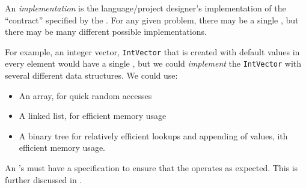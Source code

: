 \begin{definition}[Implementation]\label{def:ADT_Implementation}
  An \emph{implementation} is the language/project designer's implementation of the ``contract'' specified by the .
  For any given problem, there may be a single , but there may be many different possible implementations.

  For example, an integer vector, \texttt{IntVector} that is created with default values in every element would have a single , but we could \emph{implement} the \texttt{IntVector} with several different data structures.
  We could use:
  \begin{itemize}[noitemsep]
  \item An array, for quick random accesses
  \item A linked list, for efficient memory usage
  \item A binary tree for relatively efficient lookups and appending of values, ith efficient memory usage.
  \end{itemize}

  \begin{remark}\label{rmk:ADT_Implementation_Specification}
    An 's  must have a specification to ensure that the  operates as expected.
    This is further discussed in .
  \end{remark}
\end{definition}

